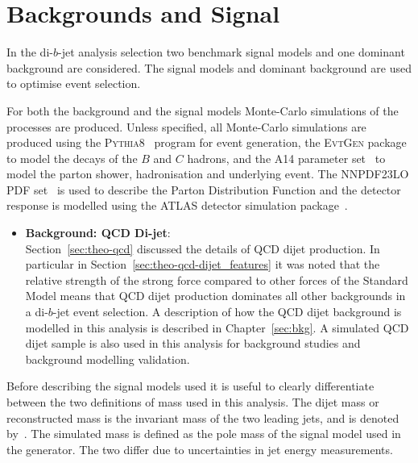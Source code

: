 \section{Backgrounds and Signal}
\label{sec:evt-s+b}

In the di-$b$-jet analysis selection two
benchmark signal models and one dominant background are considered.
The signal models and dominant background are
used to optimise event selection.

For both the background and the signal models Monte-Carlo simulations of the processes are produced.
Unless specified, all Monte-Carlo simulations are produced using
the \textsc{Pythia8}~\cite{dibjet-pythia8} program for event generation,
the \textsc{EvtGen} package~\cite{trig-evtGen} to model the decays of the $B$ and $C$ hadrons,
and the A14 parameter set~\cite{dibjet-a14} to model the parton shower, hadronisation and underlying event.
The NNPDF23LO PDF set~\cite{dibjet-nnpdf} is used to describe the Parton Distribution Function and
the detector response is modelled using the ATLAS detector simulation package~\cite{dijet-sim_ATLAS}.

\begin{itemize}[leftmargin=*]
\item\textbf{Background: QCD Di-jet}:  \vspace{1em} \\
  Section~\ref{sec:theo-qcd} discussed the details of QCD dijet production.
  In particular in Section~\ref{sec:theo-qcd-dijet_features} it was noted that the
  relative strength of the strong force compared to other forces
  of the Standard Model means that QCD dijet production dominates all other backgrounds in a di-$b$-jet event selection.
  A description of how the QCD dijet background is modelled in this analysis is described in Chapter~\ref{sec:bkg}.
  A simulated QCD dijet sample is also used in this analysis
  for background studies and background modelling validation.
  \end{itemize}

\noindent
Before describing the signal models used it is useful to clearly differentiate between the two definitions of mass used in this analysis.
The dijet mass or reconstructed mass is the invariant mass of the two leading jets, and is denoted by~\mjj.
The simulated mass is defined as the pole mass of the signal model used in the generator.
The two differ due to uncertainties in jet energy measurements.

